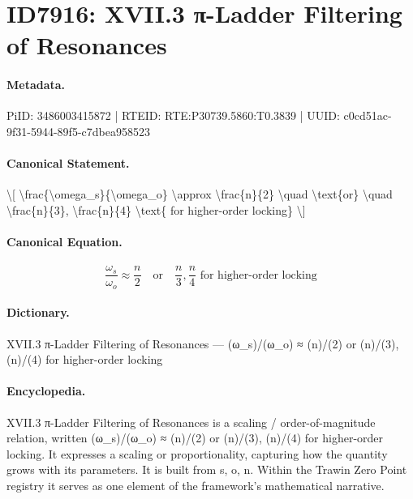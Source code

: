 \section*{ID7916: XVII.3 π-Ladder Filtering of Resonances}
\paragraph{Metadata.}
PiID: 3486003415872 | RTEID: RTE:P30739.5860:T0.3839 | UUID: c0cd51ac-9f31-5944-89f5-c7dbea958523

\paragraph{Canonical Statement.}
\textbackslash{}[ \textbackslash{}frac\{\textbackslash{}omega\_s\}\{\textbackslash{}omega\_o\} \textbackslash{}approx \textbackslash{}frac\{n\}\{2\} \textbackslash{}quad \textbackslash{}text\{or\} \textbackslash{}quad \textbackslash{}frac\{n\}\{3\}, \textbackslash{}frac\{n\}\{4\} \textbackslash{}text\{ for higher-order locking\} \textbackslash{}]

\paragraph{Canonical Equation.}
\[
\frac{\omega_s}{\omega_o} \approx \frac{n}{2} \quad \text{or} \quad \frac{n}{3}, \frac{n}{4} \text{ for higher-order locking}
\]

\paragraph{Dictionary.}
XVII.3 π-Ladder Filtering of Resonances — (ω\_s)/(ω\_o) ≈ (n)/(2) or (n)/(3), (n)/(4) for higher-order locking

\paragraph{Encyclopedia.}
XVII.3 π-Ladder Filtering of Resonances is a scaling / order-of-magnitude relation, written (ω\_s)/(ω\_o) ≈ (n)/(2) or (n)/(3), (n)/(4) for higher-order locking. It expresses a scaling or proportionality, capturing how the quantity grows with its parameters. It is built from s, o, n. Within the Trawin Zero Point registry it serves as one element of the framework's mathematical narrative.
